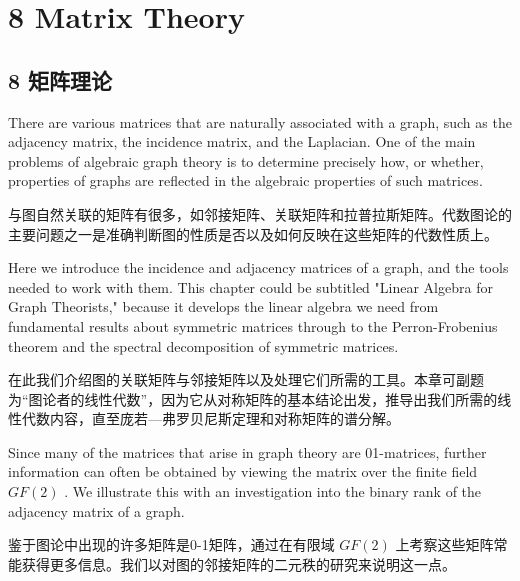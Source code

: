 \documentclass[10pt]{article}
\begin{document}
\section*{8 Matrix Theory}

\begin{tcolorbox}\relax
\section*{8 矩阵理论}
\end{tcolorbox}

There are various matrices that are naturally associated with a graph, such as the adjacency matrix, the incidence matrix, and the Laplacian. One of the main problems of algebraic graph theory is to determine precisely how, or whether, properties of graphs are reflected in the algebraic properties of such matrices.

\begin{tcolorbox}\relax
与图自然关联的矩阵有很多，如邻接矩阵、关联矩阵和拉普拉斯矩阵。代数图论的主要问题之一是准确判断图的性质是否以及如何反映在这些矩阵的代数性质上。
\end{tcolorbox}

Here we introduce the incidence and adjacency matrices of a graph, and the tools needed to work with them. This chapter could be subtitled "Linear Algebra for Graph Theorists," because it develops the linear algebra we need from fundamental results about symmetric matrices through to the Perron-Frobenius theorem and the spectral decomposition of symmetric matrices.

\begin{tcolorbox}\relax
在此我们介绍图的关联矩阵与邻接矩阵以及处理它们所需的工具。本章可副题为“图论者的线性代数”，因为它从对称矩阵的基本结论出发，推导出我们所需的线性代数内容，直至庞若—弗罗贝尼斯定理和对称矩阵的谱分解。
\end{tcolorbox}

Since many of the matrices that arise in graph theory are 01-matrices, further information can often be obtained by viewing the matrix over the finite field \({GF}\left( 2\right)\) . We illustrate this with an investigation into the binary rank of the adjacency matrix of a graph.

\begin{tcolorbox}\relax
鉴于图论中出现的许多矩阵是0-1矩阵，通过在有限域 \({GF}\left( 2\right)\) 上考察这些矩阵常能获得更多信息。我们以对图的邻接矩阵的二元秩的研究来说明这一点。
\end{tcolorbox}
\end{document}
